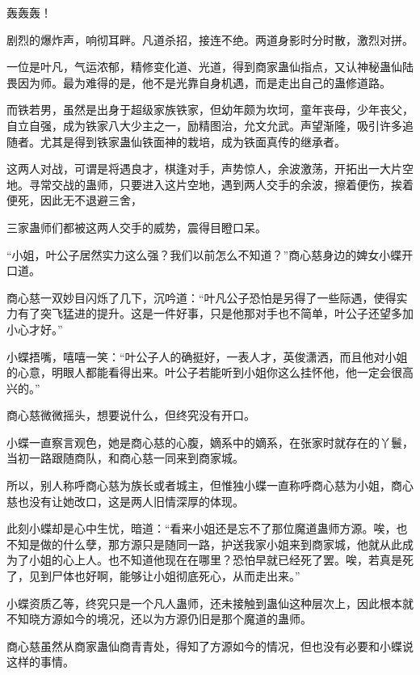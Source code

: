 
\begin{this_body}



轰轰轰！

剧烈的爆炸声，响彻耳畔。凡道杀招，接连不绝。两道身影时分时散，激烈对拼。

一位是叶凡，气运浓郁，精修变化道、光道，得到商家蛊仙指点，又认神秘蛊仙陆畏因为师。最为难得的是，他不是光靠自身机遇，而是走出自己的蛊修道路。

而铁若男，虽然是出身于超级家族铁家，但幼年颇为坎坷，童年丧母，少年丧父，自立自强，成为铁家八大少主之一，励精图治，允文允武。声望渐隆，吸引许多追随者。尤其是得到铁家蛊仙铁面神的栽培，成为铁面真传的继承者。

这两人对战，可谓是将遇良才，棋逢对手，声势惊人，余波激荡，开拓出一大片空地。寻常交战的蛊师，只要进入这片空地，遇到两人交手的余波，擦着便伤，挨着便死，因此无不退避三舍，

三家蛊师们都被这两人交手的威势，震得目瞪口呆。

“小姐，叶公子居然实力这么强？我们以前怎么不知道？”商心慈身边的婢女小蝶开口道。

商心慈一双妙目闪烁了几下，沉吟道：“叶凡公子恐怕是另得了一些际遇，使得实力有了突飞猛进的提升。这是一件好事，只是他那对手也不简单，叶公子还望多加小心才好。”

小蝶捂嘴，嘻嘻一笑：“叶公子人的确挺好，一表人才，英俊潇洒，而且他对小姐的心意，明眼人都能看得出来。叶公子若能听到小姐你这么挂怀他，他一定会很高兴的。”

商心慈微微摇头，想要说什么，但终究没有开口。

小蝶一直察言观色，她是商心慈的心腹，嫡系中的嫡系，在张家时就存在的丫鬟，当初一路跟随商队，和商心慈一同来到商家城。

所以，别人称呼商心慈为族长或者城主，但惟独小蝶一直称呼商心慈为小姐，商心慈也没有让她改口，这是两人旧情深厚的体现。

此刻小蝶却是心中生忧，暗道：“看来小姐还是忘不了那位魔道蛊师方源。唉，也不知是做的什么孽，那方源只是随同一路，护送我家小姐来到商家城，他就从此成为了小姐的心上人。也不知道他现在在哪里？恐怕早就已经死了罢。唉，若真是死了，见到尸体也好啊，能够让小姐彻底死心，从而走出来。”

小蝶资质乙等，终究只是一个凡人蛊师，还未接触到蛊仙这种层次上，因此根本就不知晓方源如今的境况，还以为方源仍旧是那个魔道的蛊师。

商心慈虽然从商家蛊仙商青青处，得知了方源如今的情况，但也没有必要和小蝶说这样的事情。


\end{this_body}
